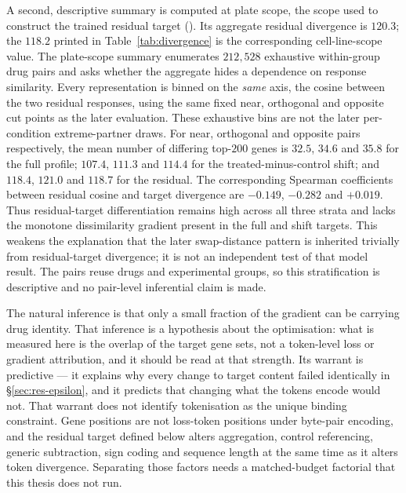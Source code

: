 A second, descriptive summary is computed at plate scope, the scope used to construct the trained
residual target (). Its aggregate residual divergence is $120.3$;
the $118.2$ printed in Table~\ref{tab:divergence} is the corresponding cell-line-scope value. The
plate-scope summary enumerates $212{,}528$ exhaustive within-group drug pairs and asks whether the
aggregate hides a dependence on response similarity. Every representation is binned on the
\emph{same} axis, the cosine between the two residual responses, using the same fixed near,
orthogonal and opposite cut points as the later evaluation. These exhaustive bins are not the
later per-condition extreme-partner draws. For near, orthogonal and opposite pairs respectively,
the mean number of differing top-$200$ genes is $32.5$, $34.6$ and $35.8$ for the full profile;
$107.4$, $111.3$ and $114.4$ for the treated-minus-control shift; and $118.4$, $121.0$ and $118.7$
for the residual. The corresponding Spearman coefficients between residual cosine and target
divergence are $-0.149$, $-0.282$ and $+0.019$. Thus residual-target differentiation remains high
across all three strata and lacks the monotone dissimilarity gradient present in the full and shift
targets. This weakens the explanation that the later swap-distance pattern is inherited trivially
from residual-target divergence; it is not an independent test of that model result. The pairs reuse
drugs and experimental groups, so this stratification is descriptive and no pair-level inferential
claim is made.

The natural inference is that only a small fraction of the gradient can be carrying drug identity.
That inference is a hypothesis about the optimisation: what is measured here is the overlap of the
target gene sets, not a token-level loss or gradient attribution, and it should be read at that
strength. Its warrant is predictive --- it explains why every change to target content failed
identically in \S\ref{sec:res-epsilon}, and it predicts that changing what the tokens encode would
not. That warrant does not identify tokenisation as the unique binding constraint. Gene positions
are not loss-token positions under byte-pair encoding, and the residual target defined below alters
aggregation, control referencing, generic subtraction, sign coding and sequence length at the same
time as it alters token divergence. Separating those factors needs a matched-budget factorial that
this thesis does not run.

